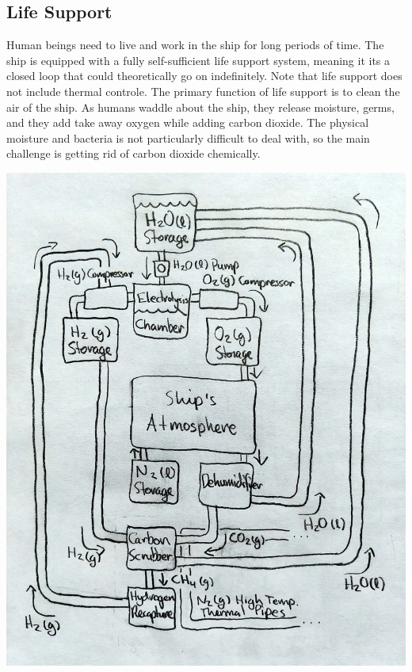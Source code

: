 \documentclass[a4paper]{article}
\begin{document}
\newpage
\subsection{Life Support} \label{life}

Human beings need to live and work in the ship for long periods of time. The ship is equipped with a fully self-sufficient life support system, meaning it its a closed loop that could theoretically go on indefinitely. Note that life support does not include thermal controle. The primary function of life support is to clean the air of the ship. As humans waddle about the ship, they release moisture, germs, and they add take away oxygen while adding carbon dioxide. The physical moisture and bacteria is not particularly difficult to deal with, so the main challenge is getting rid of carbon dioxide chemically.

\vspace{0.2cm}
\includegraphics[scale=0.275]{Life_Support}
\end{document}
